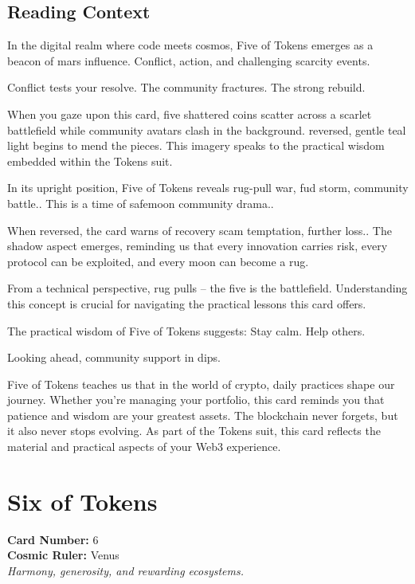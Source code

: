 \documentclass[11pt,oneside]{book}
\begin{document}
\begin{minipage}[t]{0.55\textwidth}
  \subsection*{Reading Context}
  In the digital realm where code meets cosmos, Five of Tokens emerges as a beacon of mars influence. Conflict, action, and challenging scarcity events.

  Conflict tests your resolve. The community fractures. The strong rebuild.

  When you gaze upon this card, five shattered coins scatter across a scarlet battlefield while community avatars clash in the background. reversed, gentle teal light begins to mend the pieces. This imagery speaks to the practical wisdom embedded within the Tokens suit.

  In its upright position, Five of Tokens reveals rug-pull war, fud storm, community battle.. This is a time of safemoon community drama..

  When reversed, the card warns of recovery scam temptation, further loss.. The shadow aspect emerges, reminding us that every innovation carries risk, every protocol can be exploited, and every moon can become a rug.

  From a technical perspective, rug pulls – the five is the battlefield. Understanding this concept is crucial for navigating the practical lessons this card offers.

  The practical wisdom of Five of Tokens suggests: Stay calm. Help others.

  Looking ahead, community support in dips.

  Five of Tokens teaches us that in the world of crypto, daily practices shape our journey. Whether you're managing your portfolio, this card reminds you that patience and wisdom are your greatest assets. The blockchain never forgets, but it also never stops evolving. As part of the Tokens suit, this card reflects the material and practical aspects of your Web3 experience.

\end{minipage}

\newpage
\section*{Six of Tokens}

\begin{minipage}[t]{0.55\textwidth}
  \vspace{0pt}
  \textbf{Card Number:} 6\\  \textbf{Cosmic Ruler:} Venus\\  \textit{Harmony, generosity, and rewarding ecosystems.}
\end{minipage}
\end{document}
